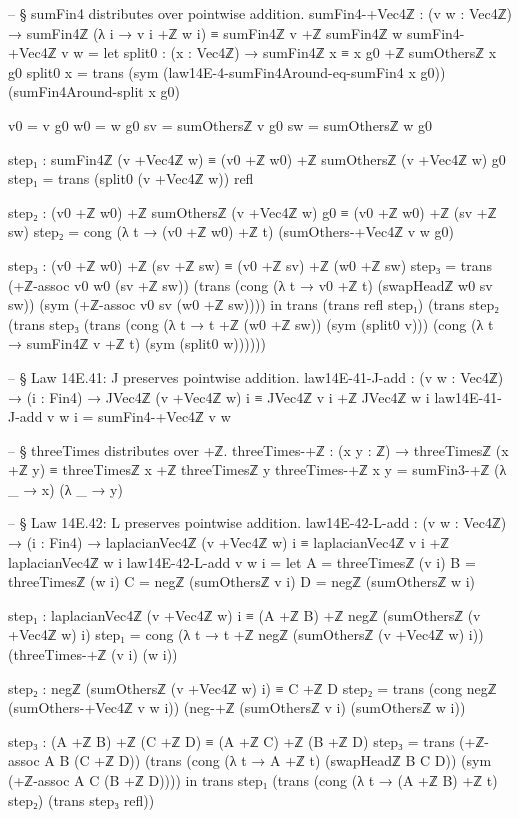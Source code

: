 \documentclass[11pt,a4paper]{book}
\begin{document}
\begin{code}
-- § sumFin4 distributes over pointwise addition.
sumFin4-+Vec4ℤ : (v w : Vec4ℤ) →
  sumFin4ℤ (λ i → v i +ℤ w i) ≡ sumFin4ℤ v +ℤ sumFin4ℤ w
sumFin4-+Vec4ℤ v w =
  let
    split0 : (x : Vec4ℤ) → sumFin4ℤ x ≡ x g0 +ℤ sumOthersℤ x g0
    split0 x =
      trans
        (sym (law14E-4-sumFin4Around-eq-sumFin4 x g0))
        (sumFin4Around-split x g0)

    v0 = v g0
    w0 = w g0
    sv = sumOthersℤ v g0
    sw = sumOthersℤ w g0

    step₁ : sumFin4ℤ (v +Vec4ℤ w) ≡ (v0 +ℤ w0) +ℤ sumOthersℤ (v +Vec4ℤ w) g0
    step₁ = trans (split0 (v +Vec4ℤ w)) refl

    step₂ : (v0 +ℤ w0) +ℤ sumOthersℤ (v +Vec4ℤ w) g0 ≡ (v0 +ℤ w0) +ℤ (sv +ℤ sw)
    step₂ = cong (λ t → (v0 +ℤ w0) +ℤ t) (sumOthers-+Vec4ℤ v w g0)

    step₃ : (v0 +ℤ w0) +ℤ (sv +ℤ sw) ≡ (v0 +ℤ sv) +ℤ (w0 +ℤ sw)
    step₃ =
      trans
        (+ℤ-assoc v0 w0 (sv +ℤ sw))
        (trans
          (cong (λ t → v0 +ℤ t) (swapHeadℤ w0 sv sw))
          (sym (+ℤ-assoc v0 sv (w0 +ℤ sw))))
  in
  trans
    (trans refl step₁)
    (trans
      step₂
      (trans
        step₃
        (trans
          (cong (λ t → t +ℤ (w0 +ℤ sw)) (sym (split0 v)))
          (cong (λ t → sumFin4ℤ v +ℤ t) (sym (split0 w))))))

-- § Law 14E.41: J preserves pointwise addition.
law14E-41-J-add : (v w : Vec4ℤ) → (i : Fin4) →
  JVec4ℤ (v +Vec4ℤ w) i ≡ JVec4ℤ v i +ℤ JVec4ℤ w i
law14E-41-J-add v w i = sumFin4-+Vec4ℤ v w

-- § threeTimes distributes over +ℤ.
threeTimes-+ℤ : (x y : ℤ) → threeTimesℤ (x +ℤ y) ≡ threeTimesℤ x +ℤ threeTimesℤ y
threeTimes-+ℤ x y =
  sumFin3-+ℤ (λ _ → x) (λ _ → y)

-- § Law 14E.42: L preserves pointwise addition.
law14E-42-L-add : (v w : Vec4ℤ) → (i : Fin4) →
  laplacianVec4ℤ (v +Vec4ℤ w) i ≡ laplacianVec4ℤ v i +ℤ laplacianVec4ℤ w i
law14E-42-L-add v w i =
  let
    A = threeTimesℤ (v i)
    B = threeTimesℤ (w i)
    C = negℤ (sumOthersℤ v i)
    D = negℤ (sumOthersℤ w i)

    step₁ : laplacianVec4ℤ (v +Vec4ℤ w) i ≡ (A +ℤ B) +ℤ negℤ (sumOthersℤ (v +Vec4ℤ w) i)
    step₁ = cong (λ t → t +ℤ negℤ (sumOthersℤ (v +Vec4ℤ w) i)) (threeTimes-+ℤ (v i) (w i))

    step₂ : negℤ (sumOthersℤ (v +Vec4ℤ w) i) ≡ C +ℤ D
    step₂ =
      trans
        (cong negℤ (sumOthers-+Vec4ℤ v w i))
        (neg-+ℤ (sumOthersℤ v i) (sumOthersℤ w i))

    step₃ : (A +ℤ B) +ℤ (C +ℤ D) ≡ (A +ℤ C) +ℤ (B +ℤ D)
    step₃ =
      trans
        (+ℤ-assoc A B (C +ℤ D))
        (trans
          (cong (λ t → A +ℤ t) (swapHeadℤ B C D))
          (sym (+ℤ-assoc A C (B +ℤ D))))
  in
  trans
    step₁
    (trans
      (cong (λ t → (A +ℤ B) +ℤ t) step₂)
      (trans
        step₃
        refl))
\end{code}
\end{document}
